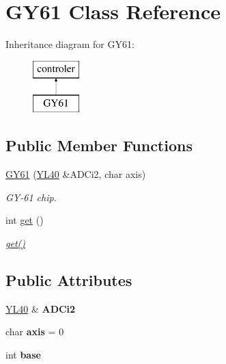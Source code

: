\hypertarget{class_g_y61}{}\section{G\+Y61 Class Reference}
\label{class_g_y61}
Inheritance diagram for G\+Y61\+:\begin{figure}[H]
\begin{center}
\leavevmode
\includegraphics[height=2.000000cm]{class_g_y61}
\end{center}
\end{figure}
\subsection*{Public Member Functions}
\begin{DoxyCompactItemize}
\item 
\mbox{\hyperlink{class_g_y61_a2599179d0c2c4c26e87aab76ab6ee410}{G\+Y61}} (\mbox{\hyperlink{class_y_l40}{Y\+L40}} \&A\+D\+Ci2, char axis)
\begin{DoxyCompactList}\small\item\em G\+Y-\/61 chip. \end{DoxyCompactList}\item 
int \mbox{\hyperlink{class_g_y61_a3163809be7dd33dc0c46ba503b55394a}{get}} ()
\begin{DoxyCompactList}\small\item\em \mbox{\hyperlink{class_g_y61_a3163809be7dd33dc0c46ba503b55394a}{get()}} \end{DoxyCompactList}\end{DoxyCompactItemize}
\subsection*{Public Attributes}
\begin{DoxyCompactItemize}
\item 
\mbox{\label{class_g_y61_a40d6e29cc3b8a0701689f868cc82ee1f}} 
\mbox{\hyperlink{class_y_l40}{Y\+L40}} \& {\bfseries A\+D\+Ci2}
\item 
\mbox{\label{class_g_y61_a0f96ea841bdcf07771c613bf16be6bb9}} 
char {\bfseries axis} = 0
\item 
\mbox{\label{class_g_y61_adc2d00c3ffff2985240cad4808422e0b}} 
int {\bfseries base}
\end{DoxyCompactItemize}


